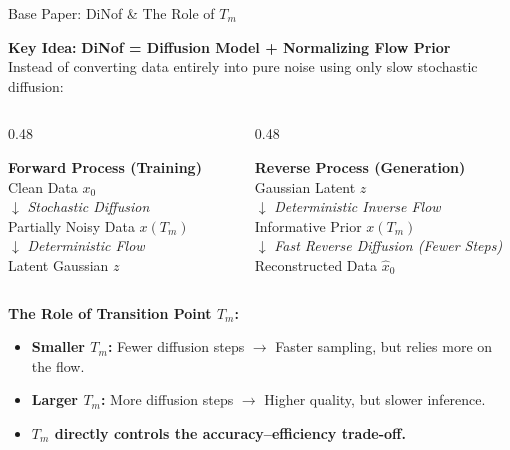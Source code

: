 \documentclass[aspectratio=169, 11pt]{beamer}
\begin{document}
\begin{frame}{Base Paper: DiNof \& The Role of $T_m$}

  \textbf{Key Idea:} \textbf{DiNof = Diffusion Model + Normalizing Flow Prior}\\[3pt]
  \small Instead of converting data entirely into pure noise using only slow stochastic diffusion:
  \vspace{6pt}

  \begin{columns}[c]
    \begin{column}{0.48\textwidth}
      \begin{block}{\centering \textbf{Forward Process (Training)}}
        \centering \small
        Clean Data $x_0$ \\
        $\downarrow$ \scriptsize \textit{Stochastic Diffusion} \\
        \small Partially Noisy Data $x(T_m)$ \\
        $\downarrow$ \scriptsize \textit{Deterministic Flow} \\
        \small Latent Gaussian $z$
      \end{block}
    \end{column}

    \begin{column}{0.48\textwidth}
      \begin{block}{\centering \textbf{Reverse Process (Generation)}}
        \centering \small
        Gaussian Latent $z$ \\
        $\downarrow$ \scriptsize \textit{Deterministic Inverse Flow} \\
        \small Informative Prior $x(T_m)$ \\
        $\downarrow$ \scriptsize \textit{Fast Reverse Diffusion (Fewer Steps)} \\
        \small Reconstructed Data $\hat{x}_0$
      \end{block}
    \end{column}
  \end{columns}

  \vspace{8pt}
  \textbf{The Role of Transition Point $T_m$:}
  \begin{itemize}\itemsep=3pt
    \item \textbf{Smaller $T_m$:} Fewer diffusion steps $\to$ Faster sampling, but relies more on the flow.
    \item \textbf{Larger $T_m$:} More diffusion steps $\to$ Higher quality, but slower inference.
    \item \textbf{$T_m$ directly controls the accuracy--efficiency trade-off.}
  \end{itemize}

\end{frame}
\end{document}
